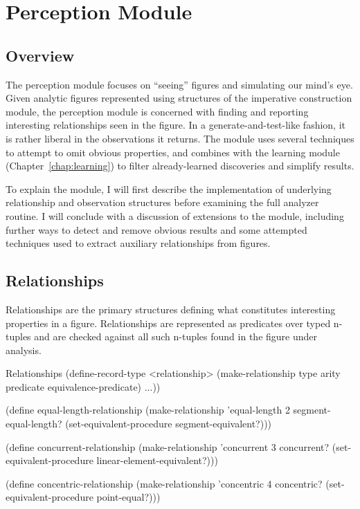 \chapter{Perception Module}
\label{chap:observer}


\section{Overview}

The perception module focuses on ``seeing'' figures and simulating our
mind's eye.  Given analytic figures represented using structures of
the imperative construction module, the perception module is concerned
with finding and reporting interesting relationships seen in the
figure. In a generate-and-test-like fashion, it is rather liberal in
the observations it returns. The module uses several techniques to
attempt to omit obvious properties, and combines with the learning
module (Chapter~\ref{chap:learning}) to filter already-learned
discoveries and simplify results.

To explain the module, I will first describe the implementation of
underlying relationship and observation structures before examining
the full analyzer routine. I will conclude with a discussion of
extensions to the module, including further ways to detect and remove
obvious results and some attempted techniques used to extract
auxiliary relationships from figures.

\section{Relationships}

Relationships are the primary structures defining what constitutes
interesting properties in a figure. Relationships are represented as
predicates over typed n-tuples and are checked against all such
n-tuples found in the figure under analysis.

\begin{code-listing}
[label=relationship-structure]
{Relationships}
(define-record-type <relationship>
  (make-relationship type arity predicate equivalence-predicate) ...))

(define equal-length-relationship
  (make-relationship 'equal-length 2 segment-equal-length?
                      (set-equivalent-procedure segment-equivalent?)))

(define concurrent-relationship
  (make-relationship 'concurrent 3 concurrent?
                      (set-equivalent-procedure linear-element-equivalent?)))

(define concentric-relationship
  (make-relationship 'concentric 4 concentric?
                      (set-equivalent-procedure point-equal?)))
\end{code-listing}

